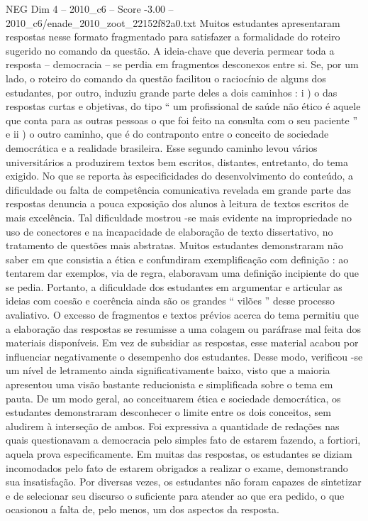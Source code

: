 \begin{textsample}{NEG Dim 4 – 2010\_c6 – Score -3.00 – 2010\_c6/enade\_2010\_zoot\_22152f82a0.txt}
Muitos estudantes apresentaram respostas nesse formato fragmentado para satisfazer a formalidade do roteiro sugerido no comando da questão.
A ideia-chave que deveria permear toda a resposta – democracia – se perdia em fragmentos desconexos entre si.
Se, por um lado, o roteiro do comando da questão facilitou o raciocínio de alguns dos estudantes, por outro, induziu grande parte deles a dois caminhos : i ) o das respostas curtas e objetivas, do tipo “ um profissional de saúde não ético é aquele que conta para as outras pessoas o que foi feito na consulta com o seu paciente ” e ii ) o outro caminho, que é do contraponto entre o conceito de sociedade democrática e a realidade brasileira.
Esse segundo caminho levou vários universitários a produzirem textos bem escritos, distantes, entretanto, do tema exigido.
No que se reporta às especificidades do desenvolvimento do conteúdo, a dificuldade ou falta de competência comunicativa revelada em grande parte das respostas denuncia a pouca exposição dos alunos à leitura de textos escritos de mais excelência.
Tal dificuldade mostrou -se mais evidente na impropriedade no uso de conectores e na incapacidade de elaboração de texto dissertativo, no tratamento de questões mais abstratas.
Muitos estudantes demonstraram não saber em que consistia a ética e confundiram exemplificação com definição : ao tentarem dar exemplos, via de regra, elaboravam uma definição incipiente do que se pedia.
Portanto, a dificuldade dos estudantes em argumentar e articular as ideias com coesão e coerência ainda são os grandes “ vilões ” desse processo avaliativo.
O excesso de fragmentos e textos prévios acerca do tema permitiu que a elaboração das respostas se resumisse a uma colagem ou paráfrase mal feita dos materiais disponíveis.
Em vez de subsidiar as respostas, esse material acabou por influenciar negativamente o desempenho dos estudantes.
Desse modo, verificou -se um nível de letramento ainda significativamente baixo, visto que a maioria apresentou uma visão bastante reducionista e simplificada sobre o tema em pauta.
De um modo geral, ao conceituarem ética e sociedade democrática, os estudantes demonstraram desconhecer o limite entre os dois conceitos, sem aludirem à interseção de ambos.
Foi expressiva a quantidade de redações nas quais questionavam a democracia pelo simples fato de estarem fazendo, a fortiori, aquela prova especificamente.
Em muitas das respostas, os estudantes se diziam incomodados pelo fato de estarem obrigados a realizar o exame, demonstrando sua insatisfação.
Por diversas vezes, os estudantes não foram capazes de sintetizar e de selecionar seu discurso o suficiente para atender ao que era pedido, o que ocasionou a falta de, pelo menos, um dos aspectos da resposta.

\end{textsample}
